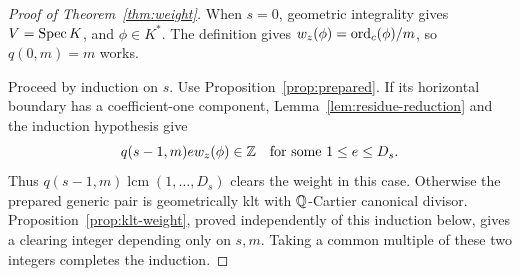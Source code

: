 \begin{proof}[Proof of Theorem~\ref{thm:weight}]
When $s=0$, geometric integrality gives $V=\operatorname{Spec} K$, and
$\phi\in K^*$.  The definition gives
$w_z(\phi)=\operatorname{ord}_c(\phi)/m$, so $q(0,m)=m$ works.

Proceed by induction on $s$.  Use Proposition~\ref{prop:prepared}.
If its horizontal boundary has a coefficient-one component,
Lemma~\ref{lem:residue-reduction} and the induction hypothesis give
\[
                       q(s-1,m)e w_z(\phi)\in\mathbb Z
                       \quad\hbox{for some }1\le e\le D_s.
\]
Thus $q(s-1,m)\operatorname{lcm}(1,\ldots,D_s)$ clears the weight
in this case.  Otherwise the prepared generic pair is geometrically
klt with $\mathbb Q$-Cartier canonical divisor.  Proposition~\ref{prop:klt-weight},
proved independently of this induction below, gives a clearing integer
depending only on $s,m$.  Taking a common multiple of these two
integers completes the induction.
\end{proof}
